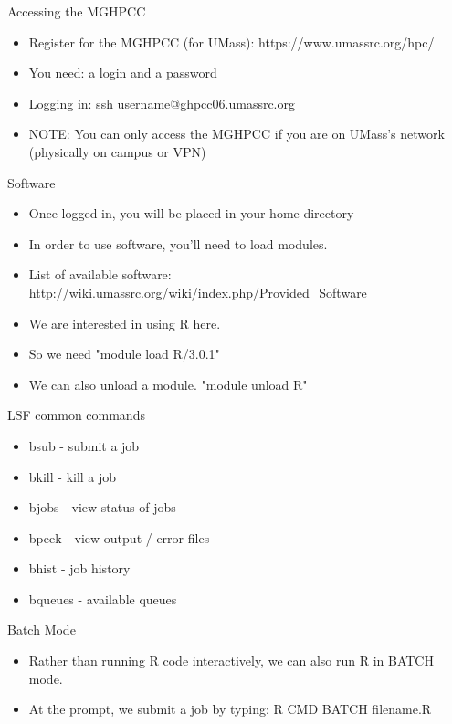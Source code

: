 \begin{frame}{Accessing the MGHPCC}
\begin{itemize}
\item Register for the MGHPCC (for UMass): https://www.umassrc.org/hpc/
\item You need: a login and a password
\item Logging in: ssh username@ghpcc06.umassrc.org
\item NOTE: You can only access the MGHPCC if you are on UMass's network (physically on campus or VPN)
\end{itemize}
\end{frame}


\begin{frame}{Software}
\begin{itemize}
\item Once logged in, you will be placed in your home directory
\item In order to use software, you'll need to load modules.  
\item List of available software: http://wiki.umassrc.org/wiki/index.php/Provided\_Software
\item We are interested in using R here.  
\item So we need "module load R/3.0.1"
\item We can also unload a module.  "module unload R"
\end{itemize}
\end{frame}


\begin{frame}{LSF common commands}
\begin{itemize}
\item bsub - submit a job
\item bkill - kill a job
\item bjobs - view status of jobs
\item bpeek - view output / error files
\item bhist - job history
\item bqueues - available queues
\end{itemize}
\end{frame}




\begin{frame}{Batch Mode}
\begin{itemize}
\item Rather than running R code interactively, we can also run R in BATCH mode.  
\item At the prompt, we submit a job by typing: R CMD BATCH filename.R
\end{itemize}
\end{frame}



